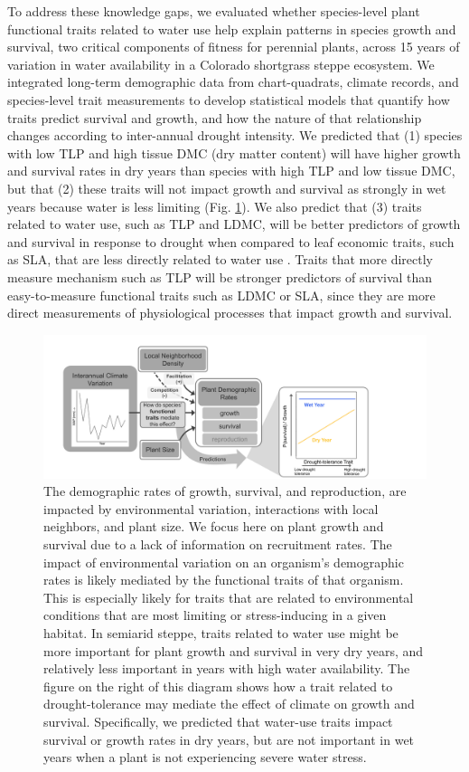\documentclass[12pt, letterpaper]{article}
\begin{document}
To address these knowledge gaps, we evaluated whether species-level plant functional traits related to water use help explain patterns in species growth and survival, two critical components of fitness for perennial plants, across 15 years of variation in water availability in a Colorado shortgrass steppe ecosystem. We integrated long-term demographic data from chart-quadrats, climate records, and species-level trait measurements to develop statistical models that quantify how traits predict survival and growth, and how the nature of that relationship changes according to inter-annual drought intensity. We predicted that (1) species with low TLP and high tissue DMC (dry matter content) will have higher growth and survival rates in dry years than species with high TLP and low tissue DMC, but that (2) these traits will not impact growth and survival as strongly in wet years because water is less limiting (Fig. \ref{fig:ConceptFig}). We also predict that (3) traits related to water use, such as TLP and LDMC, will be better predictors of growth and survival in response to drought when compared to leaf economic traits, such as SLA, that are less directly related to water use \cite{Wright2004, Reich2014}. Traits that more directly measure mechanism such as TLP will be stronger predictors of survival than easy-to-measure functional traits such as LDMC or SLA, since they are more direct measurements of physiological processes that impact growth and survival. 
\begin{figure}
\includegraphics[width=1\textwidth]{CO_sgs_ConceptualFigure.pdf}
\caption{\internallinenumbers\small{
The demographic rates of growth, survival, and reproduction, are impacted by environmental variation, interactions with local neighbors, and plant size. We focus here on plant growth and survival due to a lack of information on recruitment rates. The impact of environmental variation on an organism's demographic rates is likely mediated by the functional traits of that organism. This is especially likely for traits that are related to environmental conditions that are most limiting or stress-inducing in a given habitat. In semiarid steppe, traits related to water use might be more important for plant growth and survival in very dry years, and relatively less important in years with high water availability. The figure on the right of this diagram shows how a trait related to drought-tolerance may mediate the effect of climate on growth and survival. Specifically, we predicted that water-use traits impact survival or growth rates in dry years, but are not important in wet years when a plant is not experiencing severe water stress. 
}
}
\label{fig:ConceptFig}
\end{figure}
\end{document}
